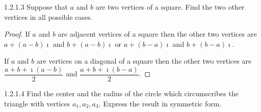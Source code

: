 \begin{problem}{1.2.1.3}
Suppose that \( a \) and \( b \) are two vertices of a square. Find the two other vertices in all possible cases.
\end{problem}

\begin{proof}
	If \( a \) and \( b \) are adjacent vertices of a square then the other two vertices are \( a + (a - b)\imath \) and \( b + (a - b)\imath \) or \( a + (b - a)\imath \) and \( b + (b - a)\imath \).

	If \( a \) and \( b \) are vertices on a diagonal of a square then the other two vertices are \( \dfrac{a + b + \imath(a - b)}{2} \) and \( \dfrac{a + b + \imath(b - a)}{2} \).
\end{proof}

\begin{problem}{1.2.1.4}
Find the center and the radius of the circle which circumscribes the triangle with vertices \( a_{1}, a_{2}, a_{3} \). Express the result in symmetric form.
\end{problem}

